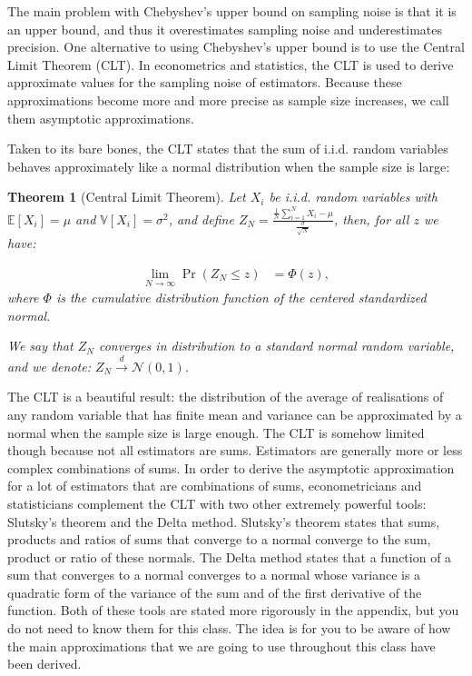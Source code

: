 \documentclass[
]{book}
\newcommand{\esp}[1]{\mathbb{E}[ #1 ]}
\newcommand{\var}[1]{\mathbb{V}[ #1 ]}
\newtheorem{theorem}{Theorem}[chapter]
\theoremstyle{definition}
\theoremstyle{definition}
\theoremstyle{definition}
\theoremstyle{definition}
\theoremstyle{remark}
\begin{document}
The main problem with Chebyshev's upper bound on sampling noise is that it is an upper bound, and thus it overestimates sampling noise and underestimates precision.
One alternative to using Chebyshev's upper bound is to use the Central Limit Theorem (CLT).
In econometrics and statistics, the CLT is used to derive approximate values for the sampling noise of estimators.
Because these approximations become more and more precise as sample size increases, we call them asymptotic approximations.

Taken to its bare bones, the CLT states that the sum of i.i.d. random variables behaves approximately like a normal distribution when the sample size is large:

\begin{theorem}[Central Limit Theorem]
\protect\hypertarget{thm:CLT}{}{\label{thm:CLT} \iffalse (Central Limit Theorem) \fi{} }Let \(X_i\) be i.i.d. random variables with \(\esp{X_i}=\mu\) and \(\var{X_i}=\sigma^2\), and define \(Z_N=\frac{\frac{1}{N}\sum_{i=1}^NX_i-\mu}{\frac{\sigma}{\sqrt{N}}}\), then, for all \(z\) we have:

\begin{align*}
\lim_{N\rightarrow\infty}\Pr(Z_N\leq z) & = \Phi(z),
\end{align*}
where \(\Phi\) is the cumulative distribution function of the centered standardized normal.

We say that \(Z_N\) converges in distribution to a standard normal random variable, and we denote: \(Z_N\stackrel{d}{\rightarrow}\mathcal{N}(0,1)\).
\end{theorem}

The CLT is a beautiful result: the distribution of the average of realisations of any random variable that has finite mean and variance can be approximated by a normal when the sample size is large enough.
The CLT is somehow limited though because not all estimators are sums.
Estimators are generally more or less complex combinations of sums.
In order to derive the asymptotic approximation for a lot of estimators that are combinations of sums, econometricians and statisticians complement the CLT with two other extremely powerful tools: Slutsky's theorem and the Delta method.
Slutsky's theorem states that sums, products and ratios of sums that converge to a normal converge to the sum, product or ratio of these normals.
The Delta method states that a function of a sum that converges to a normal converges to a normal whose variance is a quadratic form of the variance of the sum and of the first derivative of the function.
Both of these tools are stated more rigorously in the appendix, but you do not need to know them for this class.
The idea is for you to be aware of how the main approximations that we are going to use throughout this class have been derived.
\end{document}

